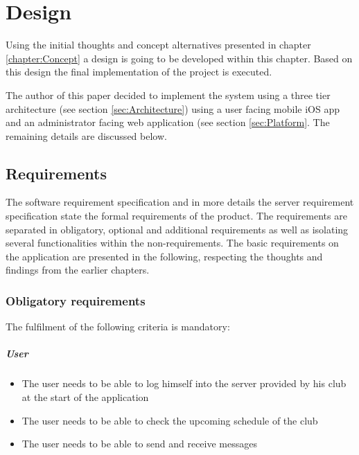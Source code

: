 \chapter{Design}

Using the initial thoughts and concept alternatives presented in chapter \vref{chapter:Concept} a design is going to be developed within this chapter. Based on this design the final implementation of the project is executed.

The author of this paper decided to implement the system using a three tier architecture (see section \vref{sec:Architecture}) using a user facing mobile iOS app and an administrator facing web application (see section \vref{sec:Platform}. The remaining details are discussed below.

\section{Requirements}
The software requirement specification \cite{Steiler:2014aa} and in more details the server requirement specification \cite{Steiler:2014ab} state the formal requirements of the product. The requirements are separated in obligatory, optional and additional requirements as well as isolating several functionalities within the non-requirements. The basic requirements on the application are presented in the following, respecting the thoughts and findings from the earlier chapters.

\subsection{Obligatory requirements} %
The fulfilment of the following criteria is mandatory:

\paragraph{User}
\begin{itemize}
\item The user needs to be able to log himself into the server provided by his club at the start of the application
\item The user needs to be able to check the upcoming schedule of the club
\item The user needs to be able to send and receive messages
\end{itemize}

